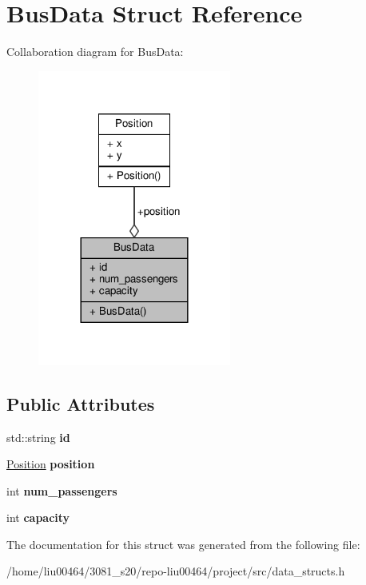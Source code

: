 \hypertarget{structBusData}{}\section{Bus\+Data Struct Reference}
\label{structBusData}


Collaboration diagram for Bus\+Data\+:\nopagebreak
\begin{figure}[H]
\begin{center}
\leavevmode
\includegraphics[width=180pt]{structBusData__coll__graph}
\end{center}
\end{figure}
\subsection*{Public Attributes}
\begin{DoxyCompactItemize}
\item 
\mbox{\label{structBusData_aaae4f1be20f1ee54bb4dd773b8580069}} 
std\+::string {\bfseries id}
\item 
\mbox{\label{structBusData_ae56b05c0d23a89ced4a0333bd65f0c96}} 
\hyperlink{structPosition}{Position} {\bfseries position}
\item 
\mbox{\label{structBusData_a4293fd5e2ffdcdd1b02a9e56f27230ec}} 
int {\bfseries num\+\_\+passengers}
\item 
\mbox{\label{structBusData_a84ea609f6ecc9b96e1ce37b47d2127a1}} 
int {\bfseries capacity}
\end{DoxyCompactItemize}


The documentation for this struct was generated from the following file\+:\begin{DoxyCompactItemize}
\item 
/home/liu00464/3081\+\_\+s20/repo-\/liu00464/project/src/data\+\_\+structs.\+h\end{DoxyCompactItemize}
